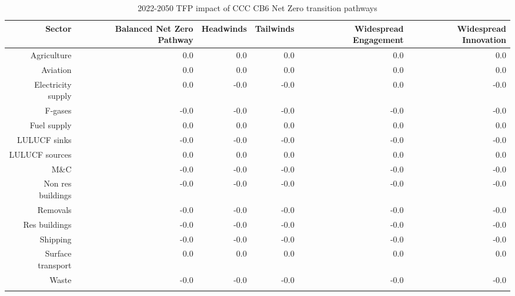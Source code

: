 \begin{longtable}{rrrrrr}
\caption{2022-2050 TFP impact of CCC CB6 Net Zero transition pathways} \\ 
  \hline
Sector & Balanced Net Zero Pathway & Headwinds & Tailwinds & Widespread Engagement & Widespread Innovation \\ 
  \hline
Agriculture & 0.0 & 0.0 & 0.0 & 0.0 & 0.0 \\ 
  Aviation & 0.0 & 0.0 & 0.0 & 0.0 & 0.0 \\ 
  Electricity supply & 0.0 & -0.0 & -0.0 & 0.0 & -0.0 \\ 
  F-gases & -0.0 & -0.0 & -0.0 & -0.0 & -0.0 \\ 
  Fuel supply & 0.0 & 0.0 & 0.0 & 0.0 & 0.0 \\ 
  LULUCF sinks & -0.0 & -0.0 & -0.0 & -0.0 & -0.0 \\ 
  LULUCF sources & 0.0 & 0.0 & 0.0 & 0.0 & 0.0 \\ 
  M\&C & -0.0 & -0.0 & -0.0 & -0.0 & -0.0 \\ 
  Non res buildings & -0.0 & -0.0 & -0.0 & -0.0 & -0.0 \\ 
  Removals & -0.0 & -0.0 & -0.0 & -0.0 & -0.0 \\ 
  Res buildings & -0.0 & -0.0 & -0.0 & -0.0 & -0.0 \\ 
  Shipping & -0.0 & -0.0 & -0.0 & -0.0 & -0.0 \\ 
  Surface transport & 0.0 & 0.0 & 0.0 & 0.0 & 0.0 \\ 
  Waste & -0.0 & -0.0 & -0.0 & -0.0 & -0.0 \\ 
   \hline
\hline
\label{tab_CCC_CB6_TFP_opex_capex}
\end{longtable}
